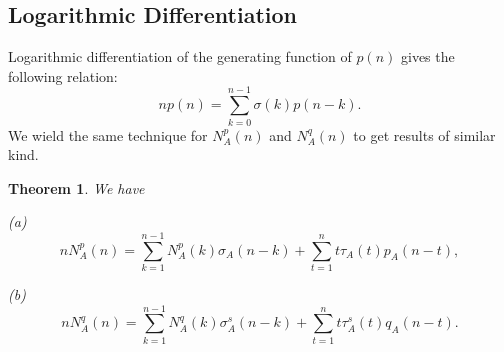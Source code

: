 \documentclass[11pt]{article}
\newtheorem{theorem}{Theorem}
\begin{document}
\subsection{ Logarithmic Differentiation}
Logarithmic differentiation of the generating function of $p(n)$ gives the following relation:
\begin{equation}\label{sigma}
np(n)=\sum_{k=0}^{n-1}\sigma(k)p(n-k).
\end{equation}
We wield the same technique for $N^p_A(n)$ and $N^q_A(n)$ to get results of similar kind.
\begin{theorem}\label{iden-4}
We have
\begin{description}
\item{(a)}
\begin{equation}
nN^p_A(n)=\sum_{k=1}^{n-1}N^p_A(k)\sigma_A(n-k)+\sum_{t=1}^{n}t\tau_A(t)p_A(n-t),
\end{equation}
\item{(b)}
\begin{equation}
nN^q_A(n)=\sum_{k=1}^{n-1}N^q_A(k)\sigma_A^s(n-k)+\sum_{t=1}^{n}t\tau_A^s(t)q_A(n-t).
\end{equation}
\end{description}
\end{theorem}
\end{document}
